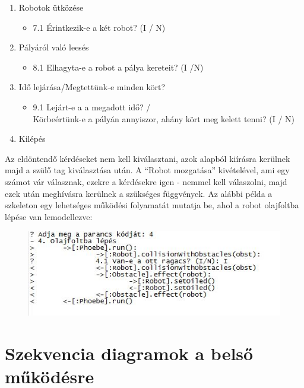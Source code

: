 \begin{enumerate}
\item Robotok ütközése
\begin{itemize}
\item 7.1 Érintkezik-e a két robot? (I / N)
\end{itemize}

\item Pályáról való leesés
\begin{itemize}
\item 8.1 Elhagyta-e a robot a pálya kereteit? (I /N)
\end{itemize}

\item Idő lejárása/Megtettünk-e minden kört?
\begin{itemize}
\item 9.1 Lejárt-e a a megadott idő? /\\ Körbeértünk-e a pályán annyiszor, ahány kört meg kelett tenni? (I / N)
\end{itemize}

\item Kilépés
\end{enumerate}
\pagebreak
Az eldöntendő kérdéseket nem kell kiválasztani, azok alapból kiírásra kerülnek majd a szülő tag kiválasztása után. A “Robot mozgatása” kivételével, ami egy számot vár válasznak, ezekre a kérdésekre igen - nemmel kell válaszolni, majd ezek után meghívásra kerülnek a szükséges függvények.
Az alábbi példa a szkeleton egy lehetséges működési folyamatát mutatja be, ahol a robot olajfoltba lépése van lemodellezve:


\begin{figure}[h]
\begin{center}
\includegraphics[width=17cm]{images/szkeleton.JPG}
\label{fig:example2}
\end{center}
\end{figure}

\pagebreak

\section{Szekvencia diagramok a belső működésre}
